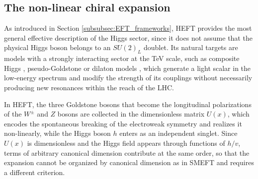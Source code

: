 \subsection{The non-linear chiral expansion}
\label{subsec:HEFT}
As introduced in Section \ref{subsubsec:EFT_frameworks}, HEFT provides the most general effective description of the Higgs sector, since it does not assume that the physical Higgs boson belongs to an $SU(2)_L$ doublet. Its natural targets are models with a strongly interacting sector at the TeV scale, such as composite Higgs \cite{Kaplan:1983fs,Agashe:2004rs}, pseudo-Goldstone \cite{Kaplan:1983sm,Contino:2010mh} or dilaton models \cite{Goldberger:2008zz,Chacko:2012sy}, which generate a light scalar in the low-energy spectrum and modify the strength of its couplings without necessarily producing new resonances within the reach of the LHC.

In HEFT, the three Goldstone bosons that become the longitudinal polarizations of the $W^\pm$ and $Z$ bosons are collected in the dimensionless matrix $U(x)$, which encodes the spontaneous breaking of the electroweak symmetry and realizes it non-linearly, while the Higgs boson $h$ enters as an independent singlet. Since $U(x)$ is dimensionless and the Higgs field appears through functions of $h/v$, terms of arbitrary canonical dimension contribute at the same order, so that the expansion cannot be organized by canonical dimension as in SMEFT and requires a different criterion.



